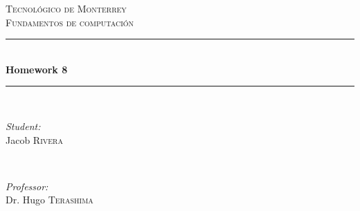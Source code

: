 \documentclass{article}
\begin{document}
\begin{titlepage}

    \newcommand{\HRule}{\rule{\linewidth}{0.5mm}} %

    \center %


    \textsc{\LARGE Tecnológico de Monterrey}\\[1.5cm] %
    \textsc{\Large Fundamentos de computación}\\[0.5cm] %


    \HRule \\[0.4cm]
    { \huge \bfseries Homework 8}\\[0.4cm] %
    \HRule \\[1.5cm]


    \begin{minipage}{0.4\textwidth}
    \begin{flushleft} \large
    \emph{Student:}\\
    Jacob \textsc{Rivera} %
    \end{flushleft}
    \end{minipage}
    ~
    \begin{minipage}{0.4\textwidth}
    \begin{flushright} \large
    \emph{Professor:} \\
    Dr. Hugo \textsc{Terashima} %
    \end{flushright}
    \end{minipage}\\[2cm]


\end{titlepage}
\end{document}
